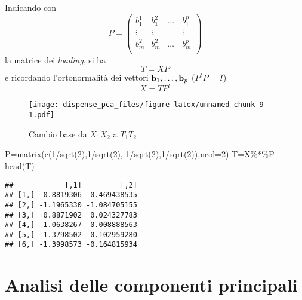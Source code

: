\documentclass[
  11pt,
]{book}
\newenvironment{Shaded}{\begin{snugshade}}{\end{snugshade}}
\newcommand{\AttributeTok}[1]{\textcolor[rgb]{0.77,0.63,0.00}{#1}}
\newcommand{\DecValTok}[1]{\textcolor[rgb]{0.00,0.00,0.81}{#1}}
\newcommand{\FunctionTok}[1]{\textcolor[rgb]{0.00,0.00,0.00}{#1}}
\newcommand{\NormalTok}[1]{#1}
\newcommand{\OtherTok}[1]{\textcolor[rgb]{0.56,0.35,0.01}{#1}}
\newcommand{\SpecialCharTok}[1]{\textcolor[rgb]{0.00,0.00,0.00}{#1}}
\begin{document}
Indicando con
\begin{equation}
P=
 \left(
 \begin{array}{cccc}
 b^1_1  & b^2_1 & \dots & b^p_1 \\
 \vdots &\vdots & \quad & \vdots \\
 b^2_m & b^2_m & \dots & b^p_m \\
 \end{array}
 \right) 
\end{equation}
la matrice dei \emph{loading}, si ha
\begin{equation}
 T=XP
\end{equation}
e ricordando l'ortonormalità dei vettori \(\bold{b}_1,\dots,\bold{b}_p\) (\(P^tP=I\))
\begin{equation}
 X=TP^t
\end{equation}

\begin{figure}
\centering
\texttt{[image: dispense\_pca\_files/figure-latex/unnamed-chunk-9-1.pdf]}
\caption{\label{fig:unnamed-chunk-9}Cambio base da \(X_1X_2\) a \(T_1T_2\) \label{fig:cambiobase}}
\end{figure}

\begin{Shaded}
\begin{Highlighting}[]
\NormalTok{P}\OtherTok{=}\FunctionTok{matrix}\NormalTok{(}\FunctionTok{c}\NormalTok{(}\DecValTok{1}\SpecialCharTok{/}\FunctionTok{sqrt}\NormalTok{(}\DecValTok{2}\NormalTok{),}\DecValTok{1}\SpecialCharTok{/}\FunctionTok{sqrt}\NormalTok{(}\DecValTok{2}\NormalTok{),}\SpecialCharTok{{-}}\DecValTok{1}\SpecialCharTok{/}\FunctionTok{sqrt}\NormalTok{(}\DecValTok{2}\NormalTok{),}\DecValTok{1}\SpecialCharTok{/}\FunctionTok{sqrt}\NormalTok{(}\DecValTok{2}\NormalTok{)),}\AttributeTok{ncol=}\DecValTok{2}\NormalTok{)}
\NormalTok{T}\OtherTok{=}\NormalTok{X}\SpecialCharTok{\%*\%}\NormalTok{P}
\FunctionTok{head}\NormalTok{(T)}
\end{Highlighting}
\end{Shaded}

\begin{verbatim}
##            [,1]         [,2]
## [1,] -0.8819306  0.469438535
## [2,] -1.1965330 -1.084705155
## [3,]  0.8871902  0.024327783
## [4,] -1.0638267  0.008888563
## [5,] -1.3798502 -0.102959280
## [6,] -1.3998573 -0.164815934
\end{verbatim}

\hypertarget{analisi-delle-componenti-principali}{%
\section{Analisi delle componenti principali}\label{analisi-delle-componenti-principali}}
\end{document}
